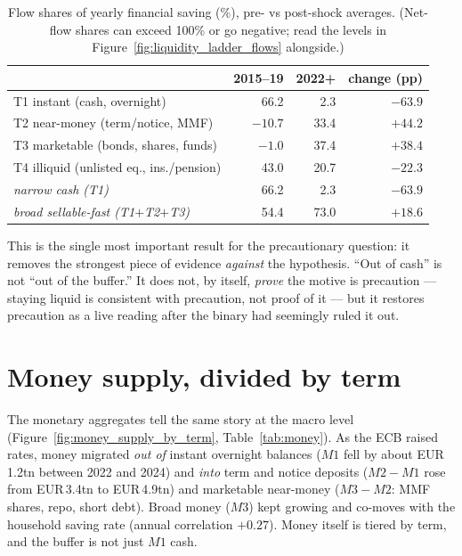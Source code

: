 \documentclass[11pt,a4paper]{article}
\begin{document}
\begin{table}[htbp]\centering\small
\caption{Flow shares of yearly financial saving (\%), pre- vs post-shock
averages. (Net-flow shares can exceed 100\% or go negative; read the levels in
Figure~\ref{fig:liquidity_ladder_flows} alongside.)}\label{tab:flows}
\begin{tabular}{@{}lrrr@{}}
\toprule
 & 2015--19 & 2022+ & change (pp) \\
\midrule
T1 instant (cash, overnight)        & 66.2 & 2.3 & $-63.9$ \\
T2 near-money (term/notice, MMF)    & $-10.7$ & 33.4 & $+44.2$ \\
T3 marketable (bonds, shares, funds)& $-1.0$ & 37.4 & $+38.4$ \\
T4 illiquid (unlisted eq., ins./pension) & 43.0 & 20.7 & $-22.3$ \\
\midrule
\emph{narrow cash (T1)}             & 66.2 & 2.3 & $-63.9$ \\
\emph{broad sellable-fast (T1$+$T2$+$T3)} & 54.4 & 73.0 & $+18.6$ \\
\bottomrule
\end{tabular}
\end{table}

This is the single most important result for the precautionary question: it
removes the strongest piece of evidence \emph{against} the hypothesis. ``Out of
cash'' is not ``out of the buffer.'' It does not, by itself, \emph{prove} the
motive is precaution --- staying liquid is consistent with precaution, not proof
of it --- but it restores precaution as a live reading after the binary had
seemingly ruled it out.

\section{Money supply, divided by term}\label{sec:money}

The monetary aggregates tell the same story at the macro level
(Figure~\ref{fig:money_supply_by_term}, Table~\ref{tab:money}). As the ECB
raised rates, money migrated \emph{out of} instant overnight balances ($M1$ fell
by about EUR\,1.2tn between 2022 and 2024) and \emph{into} term and notice
deposits ($M2-M1$ rose from EUR\,3.4tn to EUR\,4.9tn) and marketable near-money
($M3-M2$: MMF shares, repo, short debt). Broad money ($M3$) kept growing and
co-moves with the household saving rate (annual correlation $+0.27$). Money
itself is tiered by term, and the buffer is not just $M1$ cash.
\end{document}
